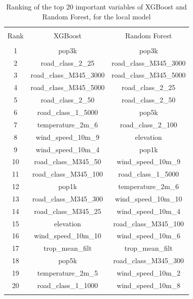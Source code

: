 \documentclass{article}
\begin{document}
\begin{table}[H] \centering 
  \caption{Ranking of the top 20 important variables of XGBoost and Random Forest, for the local model} 
    \label{nlde_vimp} 
\begin{tabular}{@{\extracolsep{5pt}} ccc} 
\\[-1.8ex]\hline 
\hline \\[-1.8ex] 
Rank & XGBoost & Random Forest \\ 
\hline \\[-1.8ex] 
1 & pop3k & pop3k \\ 
2 & road\_class\_2\_25 & road\_class\_M345\_3000 \\ 
3 & road\_class\_M345\_3000 & road\_class\_M345\_5000 \\ 
4 & road\_class\_M345\_5000 & road\_class\_2\_25 \\ 
5 & road\_class\_2\_50 & road\_class\_2\_50 \\ 
6 & road\_class\_1\_5000 & pop5k \\ 
7 & temperature\_2m\_6 & road\_class\_2\_100 \\ 
8 & wind\_speed\_10m\_9 & elevation \\ 
9 & wind\_speed\_10m\_4 & pop1k \\ 
10 & road\_class\_M345\_50 & wind\_speed\_10m\_9 \\ 
11 & road\_class\_M345\_100 & road\_class\_1\_5000 \\ 
12 & pop1k & temperature\_2m\_6 \\ 
13 & road\_class\_M345\_300 & wind\_speed\_10m\_10 \\ 
14 & road\_class\_M345\_25 & wind\_speed\_10m\_4 \\ 
15 & elevation & road\_class\_M345\_100 \\ 
16 & wind\_speed\_10m\_10 & wind\_speed\_10m\_6 \\ 
17 & trop\_mean\_filt & trop\_mean\_filt \\ 
18 & pop5k & road\_class\_M345\_300 \\ 
19 & temperature\_2m\_5 & wind\_speed\_10m\_2 \\ 
20 & road\_class\_1\_1000 & wind\_speed\_10m\_8 \\ 
\hline \\[-1.8ex] 
\end{tabular} 
\end{table} 
\end{document}
